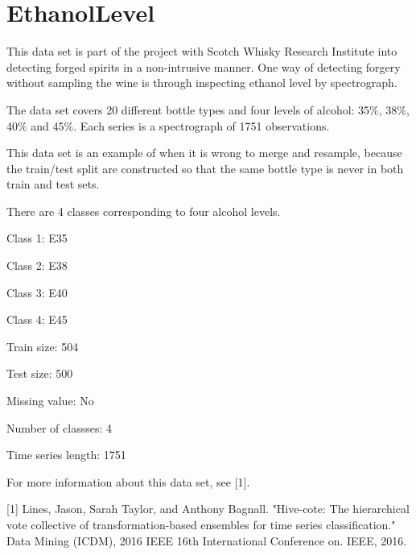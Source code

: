 \chapter{Ethanol\+Level}
\hypertarget{md_external_2data_2UCRArchive__2018_2EthanolLevel_2README}{}\label{md_external_2data_2UCRArchive__2018_2EthanolLevel_2README}
\label{md_external_2data_2UCRArchive__2018_2EthanolLevel_2README_autotoc_md68}%
%
 This data set is part of the project with Scotch Whisky Research Institute into detecting forged spirits in a non-\/intrusive manner. One way of detecting forgery without sampling the wine is through inspecting ethanol level by spectrograph.

The data set covers 20 different bottle types and four levels of alcohol\+: 35\%, 38\%, 40\% and 45\%. Each series is a spectrograph of 1751 observations.

This data set is an example of when it is wrong to merge and resample, because the train/test split are constructed so that the same bottle type is never in both train and test sets.

There are 4 classes corresponding to four alcohol levels.


\begin{DoxyItemize}
\item Class 1\+: E35
\item Class 2\+: E38
\item Class 3\+: E40
\item Class 4\+: E45
\end{DoxyItemize}

Train size\+: 504

Test size\+: 500

Missing value\+: No

Number of classses\+: 4

Time series length\+: 1751

For more information about this data set, see \mbox{[}1\mbox{]}.

\mbox{[}1\mbox{]} Lines, Jason, Sarah Taylor, and Anthony Bagnall. "{}\+Hive-\/cote\+: The hierarchical vote collective of transformation-\/based ensembles for time series classification."{} Data Mining (ICDM), 2016 IEEE 16th International Conference on. IEEE, 2016. 
